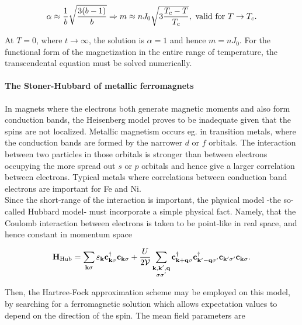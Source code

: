 \begin{align}
    \alpha \approx \frac{1}{b} \sqrt{\frac{3(b-1)}{b}} \Rightarrow m \approx nJ_0 \sqrt{3 \frac{T_c - T}{T_c}}, \textnormal{ valid for } T \rightarrow T_c.    
\end{align}


At $T=0$, where $t \rightarrow\infty$, the solution is $\alpha = 1$ and hence $m = n J_0$. For the functional form of the magnetization in the entire range of temperature, the transcendental equation must be solved numerically. \\

\paragraph{\textbf{The Stoner-Hubbard of metallic ferromagnets}}

In magnets where the electrons both generate magnetic moments and also form conduction bands, the Heisenberg model proves to be inadequate given that the spins are not localized. Metallic magnetism occurs eg. in transition metals, where the conduction bands are formed by the narrower $d$ or $f$ orbitals. The interaction between two particles in those orbitals is stronger than between electrons occupying the more spread out $s$ or $p$ orbitals and hence give a larger correlation between electrons. Typical metals where correlations between conduction band electrons are important for Fe and Ni. \\

Since the short-range of the interaction is important, the physical model -the so-called Hubbard model- must incorporate a simple physical fact. Namely, that the Coulomb interaction between electrons is taken to be point-like in real space, and hence constant in momentum space

\begin{equation}
    {\bf H}_{\textnormal{Hub}} = \sum_{{\bf k} \sigma} \varepsilon_{{\bf k}} {\bf c}_{{\bf k}\sigma}^\dagger {\bf c}_{{\bf k}\sigma} + \frac{U}{2\mathcal{V}} \sum_{\substack{{\bf k}, {\bf k}', {\bf q} \\
          {\sigma \sigma'}}} {\bf c}_{{\bf k+q} \sigma}^\dagger {\bf c}_{{\bf k'-q} \sigma'}^\dagger {\bf c}_{{\bf k}' \sigma'} {\bf c}_{{\bf k}\sigma}.
\end{equation}

Then, the Hartree-Fock approximation scheme may be employed on this model, by searching for a ferromagnetic solution which allows expectation values to depend on the direction of the spin. The mean field parameters are 

